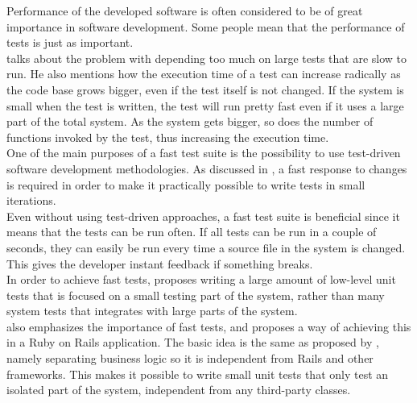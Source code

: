\label{sec:theory_time}
Performance of the developed software is often considered to be of great
importance in software development. Some people mean that the
performance of tests is just as important.\\

\citet{video:fast_slow_test} talks about the problem with depending too
much on large tests that are slow to run. He also mentions how the
execution time of a test can increase radically as the code base grows
bigger, even if the test itself is not changed. If the system is small
when the test is written, the test will run pretty fast even if it uses
a large part of the total system. As the system gets bigger, so does the
number of functions invoked by the test, thus increasing the execution
time.\\

One of the main purposes of a fast test suite is the possibility to use
test-driven software development methodologies. As discussed in
, a fast response to changes is required in order to make
it practically possible to write tests in small iterations.\\

Even without using test-driven approaches, a fast test suite is
beneficial since it means that the tests can be run often. If all tests
can be run in a couple of seconds, they can easily be run every time a
source file in the system is changed. This gives the developer instant
feedback if something breaks.\\

In order to achieve fast tests, \citeauthor{video:fast_slow_test}
proposes writing a large amount of low-level unit tests that is focused
on a small testing part of the system, rather than many system tests
that integrates with large parts of the system.\\

\citet{video:fast_rails_tests} also emphasizes the importance of fast
tests, and proposes a way of achieving this in a Ruby on Rails
application. The basic idea is the same as proposed by
\citeauthor{video:fast_slow_test}, namely separating business logic so
it is independent from Rails and other frameworks. This makes it
possible to write small unit tests that only test an isolated part of
the system, independent from any third-party classes.\\
